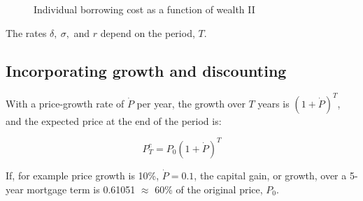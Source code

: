 \begin{figure}
\caption{Individual borrowing cost as a function of wealth II}
\label{Fig:Borrowingrate2}
\end{figure}

The rates $\delta,\ \sigma,$ and $r$ depend on the period, $T$. 

\subsection{Incorporating growth and discounting}

With a price-growth rate of $\dot P$ per year, the growth over $T$ years is $(1+\dot P)^T$, and  %
the expected price at the end of the period is:

\[P^e_T=P_0(1+\dot P)^T\]

If, for example price growth is 10\%, $\dot P= 0.1$, the {capital gain}, or growth, over a 5-year mortgage term is 0.61051 $\approx$ 60\% of the original price, $P_0$.

